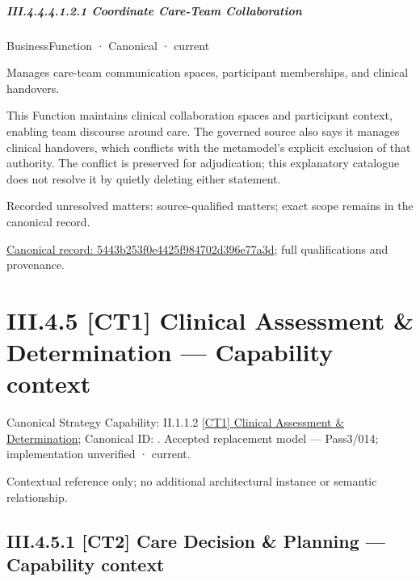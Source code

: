 \subparagraph*{III.4.4.4.1.2.1 Coordinate Care-Team Collaboration}
\label{navigation:III.4.4.4.1.2.1}

\label{element:5443b253f0e4425f984702d396e77a3d}
{\small BusinessFunction · Canonical · current}\par

Manages care-team communication spaces, participant memberships, and clinical handovers.



This Function maintains clinical collaboration spaces and participant context, enabling team discourse around care. The governed source also says it manages clinical handovers, which conflicts with the metamodel's explicit exclusion of that authority. The conflict is preserved for adjudication; this explanatory catalogue does not resolve it by quietly deleting either statement.


{\small Recorded unresolved matters: source-qualified matters; exact scope remains in the canonical record.}\par
{\footnotesize \href{../../../../../../../../continuum/business/business-function/5443b253f0e4425f984702d396e77a3d.md}{Canonical record: 5443b253f0e4425f984702d396e77a3d}; full qualifications and provenance.}\par
\section*{III.4.5 [CT1] Clinical Assessment \& Determination — Capability context}
\label{navigation:III.4.5}

{\small Canonical Strategy Capability: II.1.1.2 \hyperref[element:fc9abc8686e54c61921f92820298e4a7]{[CT1] Clinical Assessment \& Determination}; Canonical ID: \texttt{}. Accepted replacement model — Pass3/014; implementation unverified · current.}\par
Contextual reference only; no additional architectural instance or semantic relationship.\par
\subsection*{III.4.5.1 [CT2] Care Decision \& Planning — Capability context}
\label{navigation:III.4.5.1}

